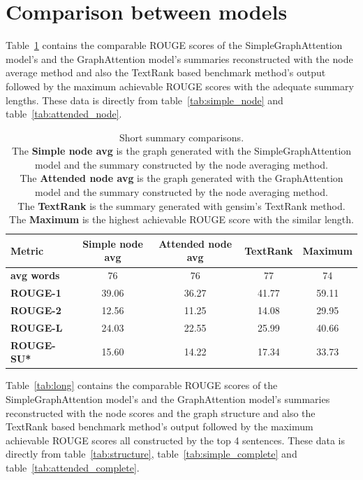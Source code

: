 \section{Comparison between models}

Table~\ref{tab:short} contains the comparable ROUGE scores of the SimpleGraphAttention model's and the GraphAttention model's summaries reconstructed with the node average method and also the TextRank based benchmark method's output followed by the maximum achievable ROUGE scores with the adequate summary lengths. These data is directly from table~\ref{tab:simple_node} and table~\ref{tab:attended_node}.

\begin{table}[!ht]
	\centering
	\begin{tabular}{| l | c | c | c | c |}
		\hline
		\textbf{Metric}&\textbf{Simple node avg}&\textbf{Attended node avg}&\textbf{TextRank}&\textbf{Maximum} \\ \hline \hline
		\textbf{avg words}&76&76&77&74 \\ \hline
		\textbf{ROUGE-1}&39.06&36.27&41.77&59.11 \\ \hline
		\textbf{ROUGE-2}&12.56&11.25&14.08&29.95 \\ \hline
		\textbf{ROUGE-L}&24.03&22.55&25.99&40.66 \\ \hline
		\textbf{ROUGE-SU*}&15.60&14.22&17.34&33.73 \\ \hline
	\end{tabular}
	\caption{Short summary comparisons. \\ The \textbf{Simple node avg} is the graph generated with the SimpleGraphAttention model and the summary constructed by the node averaging method. \\ The \textbf{Attended node avg} is the graph generated with the GraphAttention model and the summary constructed by the node averaging method. \\ The \textbf{TextRank} is the summary generated with gensim's TextRank method. \\ The \textbf{Maximum} is the highest achievable ROUGE score with the similar length.}
	\label{tab:short}
\end{table}

Table~\ref{tab:long} contains the comparable ROUGE scores of the SimpleGraphAttention model's and the GraphAttention model's summaries reconstructed with the node scores and the graph structure and also the TextRank based benchmark method's output followed by the maximum achievable ROUGE scores all constructed by the top 4 sentences. These data is directly from table~\ref{tab:structure}, table~\ref{tab:simple_complete} and table~\ref{tab:attended_complete}.

